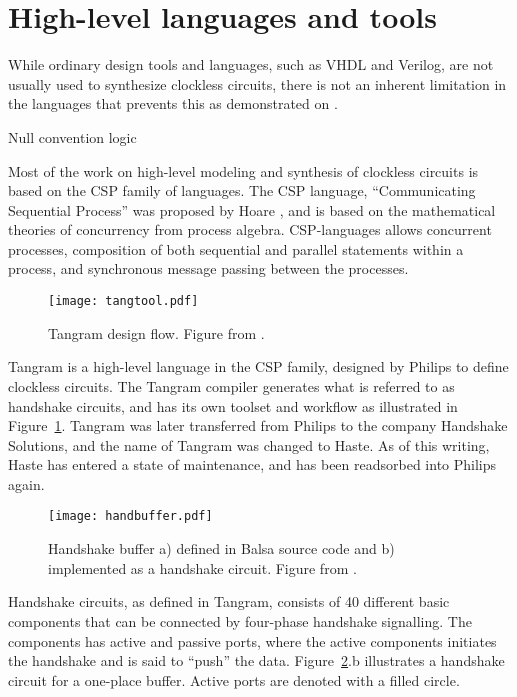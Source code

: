 \section{High-level languages and tools}
\label{sec:tools}

While ordinary design tools and languages, such as VHDL and Verilog, are not
usually used to synthesize clockless circuits, there is not an
inherent limitation in the languages that prevents this as
demonstrated on \cite[pp. 135-137]{sparso}.

Null convention logic



Most of the work on high-level modeling and synthesis of clockless
circuits is based on the CSP family of languages. The CSP language,
``Communicating Sequential Process'' was proposed by Hoare \cite{csp},
and is based on the mathematical theories of concurrency from process
algebra. CSP-languages allows concurrent processes, composition of
both sequential and parallel statements within a process, and
synchronous message passing between the processes.

\begin{figure}[htbp]
  \centering
  \texttt{[image: tangtool.pdf]}
  \caption{Tangram design flow. Figure from \cite{fullscan}.}
  \label{fig:tangtool}
\end{figure}

Tangram is a high-level language in the CSP family, designed by
Philips to define clockless circuits. The Tangram compiler generates
what is referred to as handshake circuits, and has its own toolset and
workflow as illustrated in Figure~\ref{fig:tangtool}. Tangram was
later transferred from Philips to the company Handshake Solutions, and
the name of Tangram was changed to Haste. As of this writing, Haste
has entered a state of maintenance, and has been readsorbed into
Philips again.

\begin{figure}[htbp]
  \centering
  \texttt{[image: handbuffer.pdf]}
  \caption{Handshake buffer a) defined in Balsa source code and b)
    implemented as a handshake circuit. Figure from
    \cite{taylor2008automatic}.}
  \label{fig:handbuffer}
\end{figure}

Handshake circuits, as defined in Tangram, consists of 40 different
basic components that can be connected by four-phase handshake
signalling. The components has active and passive ports, where the
active components initiates the handshake and is said to ``push'' the
data. Figure~\ref{fig:handbuffer}.b illustrates a handshake circuit for
a one-place buffer. Active ports are denoted with a filled circle.

